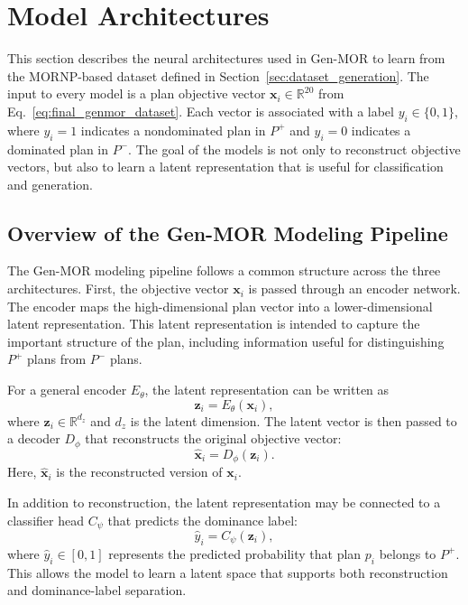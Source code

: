 \section{Model Architectures}
\label{sec:model_architectures}

This section describes the neural architectures used in Gen-MOR to learn from the MORNP-based dataset defined in Section~\ref{sec:dataset_generation}. The input to every model is a plan objective vector $\mathbf{x}_i \in \mathbb{R}^{20}$ from Eq.~\eqref{eq:final_genmor_dataset}. Each vector is associated with a label $y_i \in \{0,1\}$, where $y_i=1$ indicates a nondominated plan in $P^{+}$ and $y_i=0$ indicates a dominated plan in $P^{-}$. The goal of the models is not only to reconstruct objective vectors, but also to learn a latent representation that is useful for classification and generation.

\subsection{Overview of the Gen-MOR Modeling Pipeline}
\label{subsec:modeling_pipeline}

The Gen-MOR modeling pipeline follows a common structure across the three architectures. First, the objective vector $\mathbf{x}_i$ is passed through an encoder network. The encoder maps the high-dimensional plan vector into a lower-dimensional latent representation. This latent representation is intended to capture the important structure of the plan, including information useful for distinguishing $P^{+}$ plans from $P^{-}$ plans.

For a general encoder $E_{\theta}$, the latent representation can be written as
\begin{equation}
    \mathbf{z}_i = E_{\theta}(\mathbf{x}_i),
    \label{eq:generic_encoder}
\end{equation}
where $\mathbf{z}_i \in \mathbb{R}^{d_z}$ and $d_z$ is the latent dimension. The latent vector is then passed to a decoder $D_{\phi}$ that reconstructs the original objective vector:
\begin{equation}
    \hat{\mathbf{x}}_i = D_{\phi}(\mathbf{z}_i).
    \label{eq:generic_decoder}
\end{equation}
Here, $\hat{\mathbf{x}}_i$ is the reconstructed version of $\mathbf{x}_i$.

In addition to reconstruction, the latent representation may be connected to a classifier head $C_{\psi}$ that predicts the dominance label:
\begin{equation}
    \hat{y}_i = C_{\psi}(\mathbf{z}_i),
    \label{eq:generic_classifier}
\end{equation}
where $\hat{y}_i \in [0,1]$ represents the predicted probability that plan $p_i$ belongs to $P^{+}$. This allows the model to learn a latent space that supports both reconstruction and dominance-label separation.

